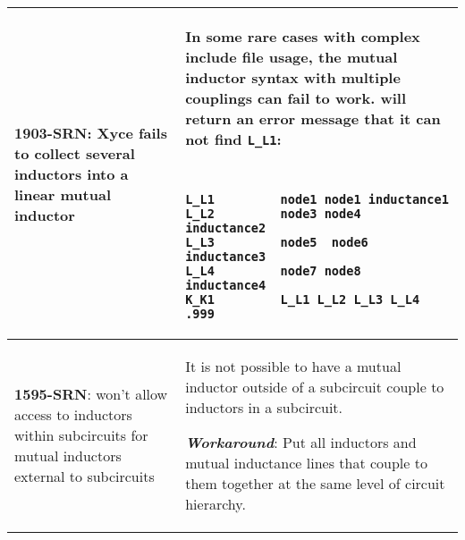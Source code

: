 {\begin{longtable}[h] {>{\raggedright\small}m{2in}|>{\raggedright\let\\\tabularnewline\small}m{3.5in}}
\textbf{1903-SRN}: Xyce fails to collect several inductors into a linear mutual inductor &
In some rare cases with complex include file usage, the mutual inductor syntax with multiple couplings can fail to work. \Xyce{} will return an error message that it can not find 
\texttt{L\_L1}:
{\tt
\begin{verbatim}
L_L1         node1 node1 inductance1
L_L2         node3 node4  inductance2
L_L3         node5  node6  inductance3
L_L4         node7 node8  inductance4
K_K1         L_L1 L_L2 L_L3 L_L4   .999 
\end{verbatim}
}

\\ \hline

\textbf{1595-SRN}: \Xyce{} won't allow access to inductors within subcircuits for
mutual inductors external to subcircuits & It is not possible to have a mutual
inductor outside of a subcircuit couple to inductors in a subcircuit.

\textbf{\textit{Workaround}}: Put all inductors and mutual inductance lines that couple to
them together at the same level of circuit hierarchy.
\\ \hline


\end{longtable}
}

